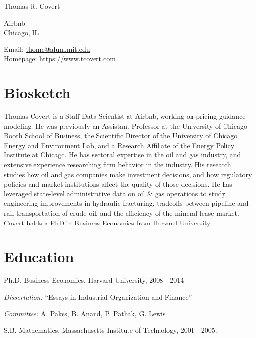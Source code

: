 \documentclass[10pt,letterpaper]{article}
\def\name{Thomas R. Covert}
\renewenvironment{itemize}{
  \begin{list}{}{
    \setlength{\leftmargin}{1.5em}
    \setlength{\itemsep}{0.25em}
    \setlength{\parskip}{0pt}
    \setlength{\parsep}{0.25em}
  }
}{
  \end{list}
}
\begin{document}
{\huge \name}




\bigskip


\begin{minipage}[t]{0.495\textwidth}
  Airbnb \\
  Chicago, IL
\end{minipage}
\begin{minipage}[t]{0.495\textwidth}
  Email: \href{mailto:thomc@alum.mit.edu}{thomc@alum.mit.edu} \\
  Homepage: \href{https://www.tcovert.com}{https://www.tcovert.com}
\end{minipage}


\section*{Biosketch}
Thomas Covert is a Staff Data Scientist at Airbnb, working on pricing guidance modeling. He was previously an Assistant Professor at the University of Chicago Booth School of Business, the Scientific Director of the University of Chicago Energy and Environment Lab, and a Research Affiliate of the Energy Policy Institute at Chicago. He has sectoral expertise in the oil and gas industry, and extensive experience researching firm behavior in the industry. His research studies how oil and gas companies make investment decisions, and how regulatory policies and market institutions affect the quality of those decisions. He has leveraged state-level administrative data on oil \& gas operations to study engineering improvements in hydraulic fracturing, tradeoffs between pipeline and rail transportation of crude oil, and the efficiency of the mineral lease market. Covert holds a PhD in Business Economics from Harvard University.


\section*{Education}


\begin{itemize}
  \item Ph.D. Business Economics, Harvard University, 2008 - 2014
    \begin{itemize}
    \item \emph{Dissertation:} ``Essays in Industrial Organization and Finance''
    \item \emph{Committee:} A. Pakes, B. Anand, P. Pathak, G. Lewis
    \end{itemize}
  \item S.B. Mathematics, Massachusetts Institute of Technology, 2001 - 2005.
\end{itemize}
\end{document}
